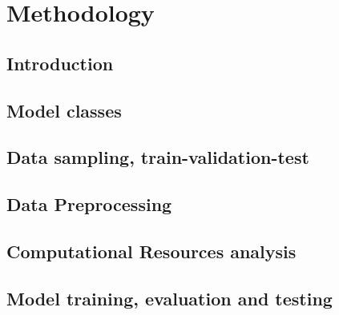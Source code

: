 \chapter{Methodology}

\section{Introduction}

\section{Model classes}

\section{Data sampling, train-validation-test}

\section{Data Preprocessing}

\section{Computational Resources analysis}

\section{Model training, evaluation and testing}





